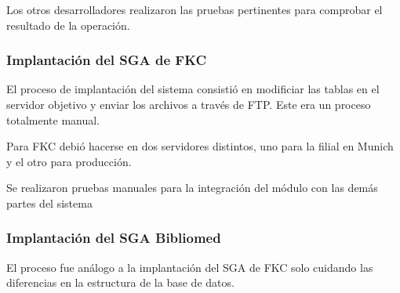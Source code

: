 Los otros desarrolladores realizaron las pruebas pertinentes para comprobar el resultado de la operación.

\subsubsection{Implantación del SGA de FKC}

El proceso de implantación del sistema consistió en modificiar las tablas en el servidor objetivo y enviar los archivos a través de FTP. Este era un proceso totalmente manual.

Para FKC debió hacerse en dos servidores distintos, uno para la filial en Munich y el otro para producción.

Se realizaron pruebas manuales para la integración del módulo con las demás partes del sistema

\subsubsection{Implantación del SGA Bibliomed}

El proceso fue análogo a la implantación del SGA de FKC solo cuidando las diferencias en la estructura de la base de datos.



